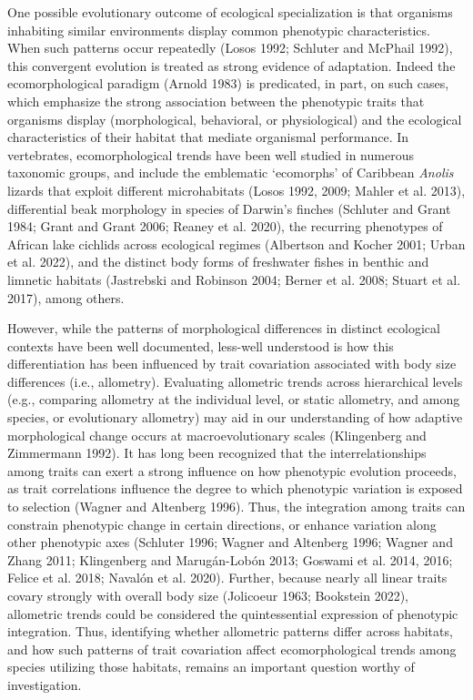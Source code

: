 \documentclass[
  11pt,
]{article}
\begin{document}
One possible evolutionary outcome of ecological specialization is that
organisms inhabiting similar environments display common phenotypic
characteristics. When such patterns occur repeatedly (Losos 1992;
Schluter and McPhail 1992), this convergent evolution is treated as
strong evidence of adaptation. Indeed the ecomorphological paradigm
(Arnold 1983) is predicated, in part, on such cases, which emphasize the
strong association between the phenotypic traits that organisms display
(morphological, behavioral, or physiological) and the ecological
characteristics of their habitat that mediate organismal performance. In
vertebrates, ecomorphological trends have been well studied in numerous
taxonomic groups, and include the emblematic `ecomorphs' of Caribbean
\emph{Anolis} lizards that exploit different microhabitats (Losos 1992,
2009; Mahler et al. 2013), differential beak morphology in species of
Darwin's finches (Schluter and Grant 1984; Grant and Grant 2006; Reaney
et al. 2020), the recurring phenotypes of African lake cichlids across
ecological regimes (Albertson and Kocher 2001; Urban et al. 2022), and
the distinct body forms of freshwater fishes in benthic and limnetic
habitats (Jastrebski and Robinson 2004; Berner et al. 2008; Stuart et
al. 2017), among others. \hfill\break

However, while the patterns of morphological differences in distinct
ecological contexts have been well documented, less-well understood is
how this differentiation has been influenced by trait covariation
associated with body size differences (i.e., allometry). Evaluating
allometric trends across hierarchical levels (e.g., comparing allometry
at the individual level, or static allometry, and among species, or
evolutionary allometry) may aid in our understanding of how adaptive
morphological change occurs at macroevolutionary scales (Klingenberg and
Zimmermann 1992). It has long been recognized that the
interrelationships among traits can exert a strong influence on how
phenotypic evolution proceeds, as trait correlations influence the
degree to which phenotypic variation is exposed to selection (Wagner and
Altenberg 1996). Thus, the integration among traits can constrain
phenotypic change in certain directions, or enhance variation along
other phenotypic axes (Schluter 1996; Wagner and Altenberg 1996; Wagner
and Zhang 2011; Klingenberg and Marugán-Lobón 2013; Goswami et al. 2014,
2016; Felice et al. 2018; Navalón et al. 2020). Further, because nearly
all linear traits covary strongly with overall body size (Jolicoeur
1963; Bookstein 2022), allometric trends could be considered the
quintessential expression of phenotypic integration. Thus, identifying
whether allometric patterns differ across habitats, and how such
patterns of trait covariation affect ecomorphological trends among
species utilizing those habitats, remains an important question worthy
of investigation. \hfill\break
\end{document}
